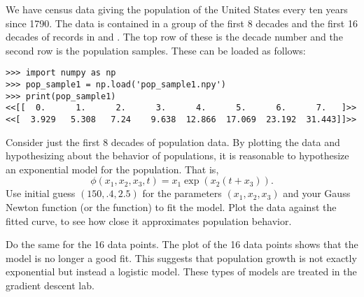 \begin{problem}
We have census data giving the population of the United States every ten years since 1790.
The data is contained in a group of the first 8 decades and the first 16 decades of records in  and .
The top row of these is the decade number and the second row is the population samples.
These can be loaded as follows:
\begin{lstlisting}
>>> import numpy as np
>>> pop_sample1 = np.load('pop_sample1.npy')
>>> print(pop_sample1)
<<[[  0.      1.      2.      3.      4.      5.      6.      7.   ]>>
<<[  3.929   5.308   7.24    9.638  12.866  17.069  23.192  31.443]]>>
\end{lstlisting}
Consider just the first 8 decades of population data. 
By plotting the data and hypothesizing about the behavior of populations, it is reasonable to hypothesize an exponential model for the population.
That is,
$$
\phi(x_1,x_2,x_3,t) = x_1\exp(x_2(t+x_3)).
$$
Use initial guess $(150, .4, 2.5)$ for the parameters $(x_1, x_2, x_3)$ and your Gauss Newton function (or the  function) to fit the model.
Plot the data against the fitted curve, to see how close it approximates population behavior.

Do the same for the 16 data points.
The plot of the 16 data points shows that the model is no longer a good fit.
This suggests that population growth is not exactly exponential but instead a logistic model.
These types of models are treated in the gradient descent lab.
\end{problem}
















